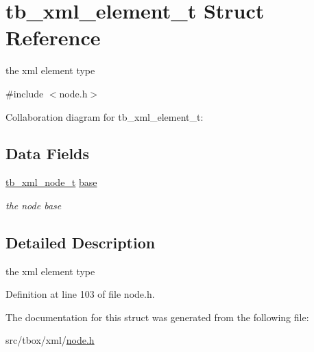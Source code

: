 \hypertarget{structtb__xml__element__t}{\section{tb\-\_\-xml\-\_\-element\-\_\-t Struct Reference}
\label{structtb__xml__element__t}
}


the xml element type  




{\ttfamily \#include $<$node.\-h$>$}



Collaboration diagram for tb\-\_\-xml\-\_\-element\-\_\-t\-:
\subsection*{Data Fields}
\begin{DoxyCompactItemize}
\item 
\hypertarget{structtb__xml__element__t_ac3abab31a2860d08f87876432ac25484}{\hyperlink{structtb__xml__node__t}{tb\-\_\-xml\-\_\-node\-\_\-t} \hyperlink{structtb__xml__element__t_ac3abab31a2860d08f87876432ac25484}{base}}\label{structtb__xml__element__t_ac3abab31a2860d08f87876432ac25484}

\begin{DoxyCompactList}\small\item\em the node base \end{DoxyCompactList}\end{DoxyCompactItemize}


\subsection{Detailed Description}
the xml element type 

Definition at line 103 of file node.\-h.



The documentation for this struct was generated from the following file\-:\begin{DoxyCompactItemize}
\item 
src/tbox/xml/\hyperlink{node_8h}{node.\-h}\end{DoxyCompactItemize}
